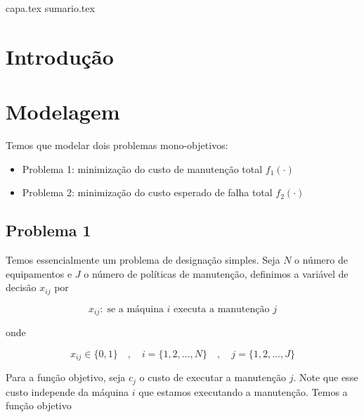 \documentclass[
	12pt,				%
	oneside,			%
	a4paper,			%
	chapter=TITLE,
	sumario=tradicional,
	english,			%
	brazil				%
]{abntex2}
\newcommand{\un}[1]{\;\text{#1}}
\begin{document}

\frenchspacing 

{capa.tex}
{sumario.tex}

\textual

\pagestyle{simple}
	
\chapter{Introdução}\label{cap:introducao} 

\chapter{Modelagem}\label{cap:modelagem} 

Temos que modelar dois problemas mono-objetivos:

\begin{itemize}
	\item Problema 1: minimização do custo de manutenção total $f_1 (\cdot)$
	\item Problema 2: minimização do custo esperado de falha total $f_2 (\cdot)$
\end{itemize}

\section{Problema 1}

Temos essencialmente um problema de designação simples. Seja $N$ o número de 
equipamentos e $J$ o número de políticas de manutenção, definimos a variável de decisão $x_{ij}$ 
por

\begin{equation}
	x_{ij}: \un{se a máquina $i$ executa a manutenção $j$}
\end{equation}

\noindent onde 

\[ x_{ij} \in \{0,1\} \quad , \quad i = \{1, 2, ..., N\}  \quad , \quad j = \{1, 2, ..., J\} \]

Para a função objetivo, seja $c_j$ o custo de executar a manutenção $j$. Note que esse custo 
independe da máquina $i$ que estamos executando a manutenção. Temos a função objetivo  
\end{document}

